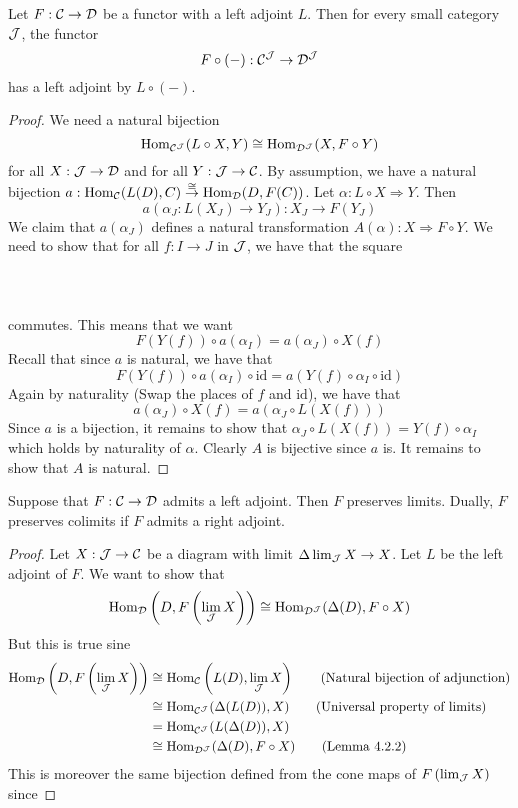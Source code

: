 \documentclass[a4paper]{article}
\begin{document}
\begin{lmm}{}{} Let $F:\mathcal{C}\to\mathcal{D}$ be a functor with a left adjoint $L$. Then for every small category $\mathcal{J}$, the functor $$F\circ(-):\mathcal{C}^{\mathcal{J}}\to\mathcal{D}^{\mathcal{J}}$$ has a left adjoint by $L\circ(-)$. \tcbline
\begin{proof}
We need a natural bijection $$\operatorname{Hom}_{\mathcal{C}^{\mathcal{J}}}(L\circ X,Y)\cong\operatorname{Hom}_{\mathcal{D}^{\mathcal{J}}}(X,F\circ Y)$$ for all $X:\mathcal{J}\to\mathcal{D}$ and for all $Y:\mathcal{J}\to\mathcal{C}$. By assumption, we have a natural bijection $a:\operatorname{Hom}_{\mathcal{C}}(L(D),C)\overset{\cong}{\to}\operatorname{Hom}_{\mathcal{D}}(D,F(C))$. Let $\alpha:L\circ X\Rightarrow Y$. Then $$a(\alpha_J:L(X_J)\to Y_J):X_J\to F(Y_J)$$ We claim that $a(\alpha_J)$ defines a natural transformation $A(\alpha):X\Rightarrow F\circ Y$. We need to show that for all $f:I\to J$ in $\mathcal{J}$, we have that the square \\~\\
 \\~\\
commutes. This means that we want $$F(Y(f))\circ a(\alpha_I)=a(\alpha_J)\circ X(f)$$ Recall that since $a$ is natural, we have that $$F(Y(f))\circ a(\alpha_I)\circ\text{id}=a(Y(f)\circ\alpha_I\circ\text{id})$$ Again by naturality (Swap the places of $f$ and $\text{id}$), we have that $$a(\alpha_J)\circ X(f)=a(\alpha_J\circ L(X(f)))$$ Since $a$ is a bijection, it remains to show that $\alpha_J\circ L(X(f))=Y(f)\circ\alpha_I$ which holds by naturality of $\alpha$. Clearly $A$ is bijective since $a$ is. It remains to show that $A$ is natural. 
\end{proof}
\end{lmm}

\begin{prp}{}{} Suppose that $F:\mathcal{C}\to\mathcal{D}$ admits a left adjoint. Then $F$ preserves limits. Dually, $F$ preserves colimits if $F$ admits a right adjoint. \tcbline
\begin{proof}
Let $X:\mathcal{J}\to\mathcal{C}$ be a diagram with limit $\Delta\lim_{\mathcal{J}} X\to X$. Let $L$ be the left adjoint of $F$. We want to show that $$\operatorname{Hom}_{\mathcal{D}}\left(D,F\left(\lim_{\mathcal{J}} X\right)\right)\cong\operatorname{Hom}_{\mathcal{D}^{\mathcal{J}}}(\Delta(D),F\circ X)$$
But this is true sine
\begin{align*}
\operatorname{Hom}_{\mathcal{D}}\left(D,F\left(\lim_{\mathcal{J}} X\right)\right)&\cong\operatorname{Hom}_{\mathcal{C}}\left(L(D),\lim_{\mathcal{J}} X\right)\tag{Natural bijection of adjunction}\\
&\cong\operatorname{Hom}_{\mathcal{C}^{\mathcal{J}}}(\Delta(L(D)),X)\tag{Universal property of limits}\\
&=\operatorname{Hom}_{\mathcal{C}^{\mathcal{J}}}(L(\Delta(D)),X)\\
&\cong\operatorname{Hom}_{\mathcal{D}^{\mathcal{J}}}(\Delta(D),F\circ X)\tag{Lemma 4.2.2}
\end{align*}
This is moreover the same bijection defined from the cone maps of $F\left(\lim_{\mathcal{J}} X\right)$ since
\end{proof}
\end{prp}
\end{document}
